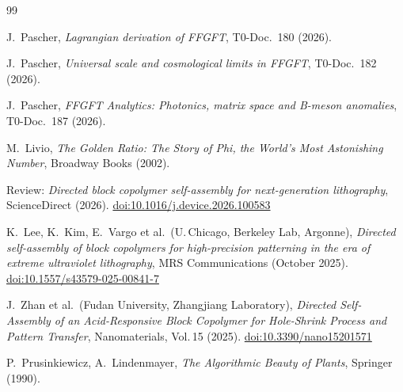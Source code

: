 \begin{thebibliography}{99}

J.~Pascher, \textit{Lagrangian derivation of FFGFT}, T0-Doc.~180 (2026).

J.~Pascher, \textit{Universal scale and cosmological limits in FFGFT},
T0-Doc.~182 (2026).

J.~Pascher, \textit{FFGFT Analytics: Photonics, matrix space and B-meson anomalies},
T0-Doc.~187 (2026).

M.~Livio, \textit{The Golden Ratio: The Story of Phi, the World's Most
Astonishing Number}, Broadway Books (2002).

Review: \textit{Directed block copolymer self-assembly for next-generation lithography},
ScienceDirect (2026).
\href{https://doi.org/10.1016/j.device.2026.100583}{doi:10.1016/j.device.2026.100583}

K.~Lee, K.~Kim, E.~Vargo et al.\ (U.\,Chicago, Berkeley Lab, Argonne),
\textit{Directed self-assembly of block copolymers for high-precision patterning
in the era of extreme ultraviolet lithography},
MRS Communications (October 2025).
\href{https://doi.org/10.1557/s43579-025-00841-7}{doi:10.1557/s43579-025-00841-7}

J.~Zhan et al.\ (Fudan University, Zhangjiang Laboratory),
\textit{Directed Self-Assembly of an Acid-Responsive Block Copolymer
for Hole-Shrink Process and Pattern Transfer},
Nanomaterials, Vol.\,15 (2025).
\href{https://doi.org/10.3390/nano15201571}{doi:10.3390/nano15201571}

P.~Prusinkiewicz, A.~Lindenmayer,
\textit{The Algorithmic Beauty of Plants},
Springer (1990).

\end{thebibliography}
